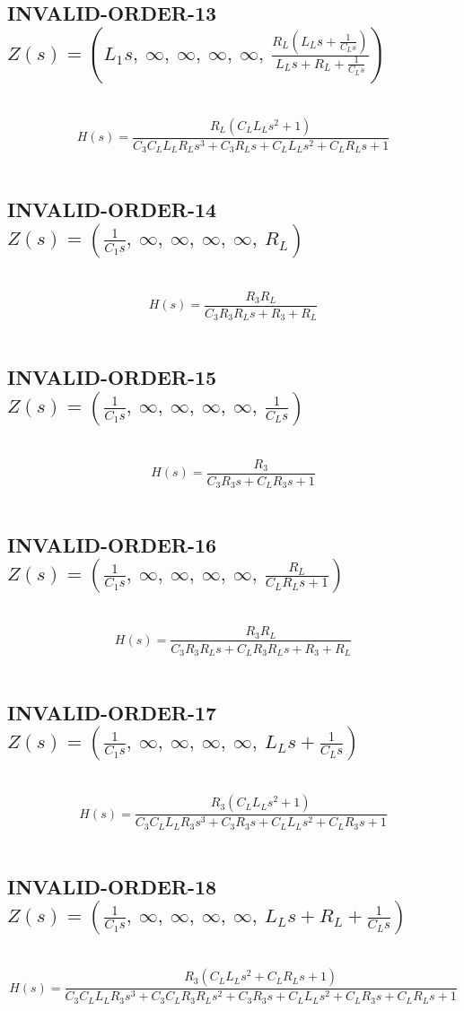 \documentclass{article}
\begin{document}
\subsection{INVALID-ORDER-13 $Z(s) = \left( L_{1} s, \  \infty, \  \infty, \  \infty, \  \infty, \  \frac{R_{L} \left(L_{L} s + \frac{1}{C_{L} s}\right)}{L_{L} s + R_{L} + \frac{1}{C_{L} s}}\right)$ } \ 
\textbf{\[H(s) = \frac{R_{L} \left(C_{L} L_{L} s^{2} + 1\right)}{C_{3} C_{L} L_{L} R_{L} s^{3} + C_{3} R_{L} s + C_{L} L_{L} s^{2} + C_{L} R_{L} s + 1}\] } \ 
\subsection{INVALID-ORDER-14 $Z(s) = \left( \frac{1}{C_{1} s}, \  \infty, \  \infty, \  \infty, \  \infty, \  R_{L}\right)$ } \ 
\textbf{\[H(s) = \frac{R_{3} R_{L}}{C_{3} R_{3} R_{L} s + R_{3} + R_{L}}\] } \ 
\subsection{INVALID-ORDER-15 $Z(s) = \left( \frac{1}{C_{1} s}, \  \infty, \  \infty, \  \infty, \  \infty, \  \frac{1}{C_{L} s}\right)$ } \ 
\textbf{\[H(s) = \frac{R_{3}}{C_{3} R_{3} s + C_{L} R_{3} s + 1}\] } \ 
\subsection{INVALID-ORDER-16 $Z(s) = \left( \frac{1}{C_{1} s}, \  \infty, \  \infty, \  \infty, \  \infty, \  \frac{R_{L}}{C_{L} R_{L} s + 1}\right)$ } \ 
\textbf{\[H(s) = \frac{R_{3} R_{L}}{C_{3} R_{3} R_{L} s + C_{L} R_{3} R_{L} s + R_{3} + R_{L}}\] } \ 
\subsection{INVALID-ORDER-17 $Z(s) = \left( \frac{1}{C_{1} s}, \  \infty, \  \infty, \  \infty, \  \infty, \  L_{L} s + \frac{1}{C_{L} s}\right)$ } \ 
\textbf{\[H(s) = \frac{R_{3} \left(C_{L} L_{L} s^{2} + 1\right)}{C_{3} C_{L} L_{L} R_{3} s^{3} + C_{3} R_{3} s + C_{L} L_{L} s^{2} + C_{L} R_{3} s + 1}\] } \ 
\subsection{INVALID-ORDER-18 $Z(s) = \left( \frac{1}{C_{1} s}, \  \infty, \  \infty, \  \infty, \  \infty, \  L_{L} s + R_{L} + \frac{1}{C_{L} s}\right)$ } \ 
\textbf{\[H(s) = \frac{R_{3} \left(C_{L} L_{L} s^{2} + C_{L} R_{L} s + 1\right)}{C_{3} C_{L} L_{L} R_{3} s^{3} + C_{3} C_{L} R_{3} R_{L} s^{2} + C_{3} R_{3} s + C_{L} L_{L} s^{2} + C_{L} R_{3} s + C_{L} R_{L} s + 1}\] } \ 
\end{document}
